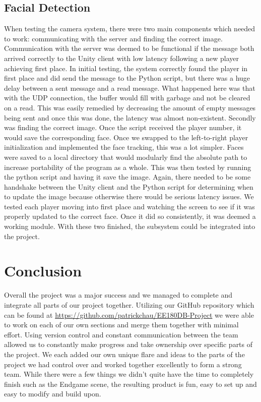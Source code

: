 \documentclass[a4paper,10pt]{article}
\begin{document}
\subsection{Facial Detection}
When testing the camera system, there were two main components which needed to work: communicating with the server and finding the correct image. Communication with the server was deemed to be functional if the message both arrived correctly to the Unity client with low latency following a new player achieving first place. In initial testing, the system correctly found the player in first place and did send the message to the Python script, but there was a huge delay between a sent message and a read message. What happened here was that with the UDP connection, the buffer would fill with garbage and not be cleared on a read. This was easily remedied by decreasing the amount of empty messages being sent and once this was done, the latency was almost non-existent. Secondly was finding the correct image. Once the script received the player number, it would save the corresponding face. Once we swapped to the left-to-right player initialization and implemented the face tracking, this was a lot simpler. Faces were saved to a local directory that would modularly find the absolute path to increase portability of the program as a whole. This was then tested by running the python script and having it save the image. Again, there needed to be some handshake between the Unity client and the Python script for determining when to update the image because otherwise there would be serious latency issues. We tested each player moving into first place and watching the screen to see if it was properly updated to the correct face. Once it did so consistently, it was deemed a working module. With these two finished, the subsystem could be integrated into the project.

\section{Conclusion}
Overall the project was a major success and we managed to complete and integrate all parts of our project together. Utilizing our GitHub repository which can be found at \href{https://github.com/patrickchau/EE180DB-Project}{https://github.com/patrickchau/EE180DB-Project} we were able to work on each of our own sections and merge them together with minimal effort. Using version control and constant communication between the team allowed us to constantly make progress and take ownership over specific parts of the project. We each added our own unique flare and ideas to the parts of the project we had control over and worked together excellently to form a strong team. While there were a few things we didn't quite have the time to completely finish such as the Endgame scene, the resulting product is fun, easy to set up and easy to modify and build upon. 
\end{document}
